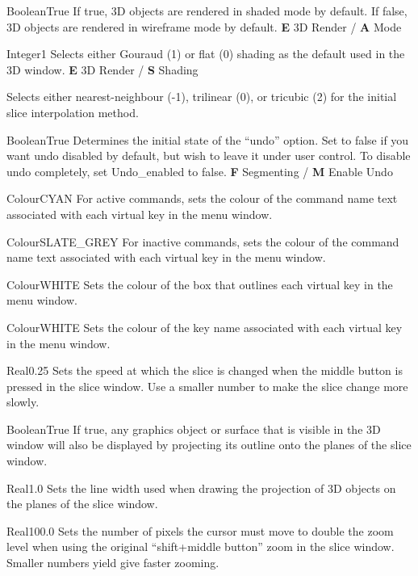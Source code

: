 {Boolean}{True}
{If true, 3D objects are rendered in shaded mode by default. If false, 3D objects are rendered in wireframe mode by default.}
{{\bf E} 3D Render / {\bf A} Mode}

{Integer}{1}
{Selects either Gouraud (1) or flat (0) shading as the default used in the 3D window.}
{{\bf E} 3D Render / {\bf S} Shading}

{Selects either nearest-neighbour (-1), trilinear (0), or tricubic (2) for the
 initial slice interpolation method.}{}

{Boolean}{True}
{Determines the initial state of the ``undo'' option. Set to false if you want undo disabled by default, but wish to leave it under user control. To disable undo completely, set Undo\_enabled to false.}
{{\bf F} Segmenting / {\bf M} Enable Undo}

 {Colour}{CYAN}
{For active commands, sets the colour of the command name text
  associated with each virtual key in the menu window.}{}

 {Colour}{SLATE\_GREY}
{For inactive commands, sets the colour of the command name text
  associated with each virtual key in the menu window.}{}

{Colour}{WHITE}
{Sets the colour of the box that outlines each virtual key in the menu window.}{}

{Colour}{WHITE}
{Sets the colour of the key name associated with each virtual key in the menu window.}{}

{Real}{0.25}
{Sets the speed at which the slice is changed when the middle button is pressed in the slice window. Use a smaller number to make the slice change more slowly.}{}

{Boolean}{True}
{If true, any graphics object or surface that is visible in the 3D window will also be displayed by projecting its outline onto the planes of the slice window.}{}

{Real}{1.0}
{Sets the line width used when drawing the projection of 3D objects on the planes of the slice window.}{}

{Real}{100.0}
{Sets the number of pixels the cursor must move to double the zoom level when using the original ``shift+middle button'' zoom in the slice window. Smaller numbers yield give faster zooming.}{}


